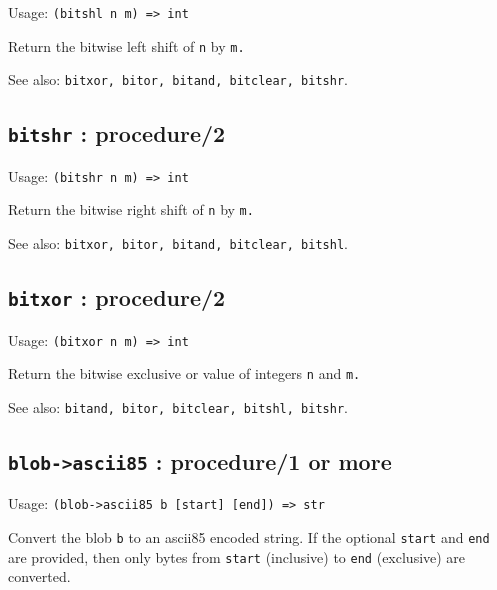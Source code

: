 \documentclass[
]{article}
\newcommand{\passthrough}[1]{#1}
\begin{document}
Usage: \passthrough{\lstinline!(bitshl n m) => int!}

Return the bitwise left shift of \passthrough{\lstinline!n!} by
\passthrough{\lstinline!m.!}

See also:
\passthrough{\lstinline!bitxor, bitor, bitand, bitclear, bitshr!}.

\hypertarget{bitshr-procedure2-1}{%
\subsection{\texorpdfstring{\texttt{bitshr} :
procedure/2}{bitshr : procedure/2}}\label{bitshr-procedure2-1}}

Usage: \passthrough{\lstinline!(bitshr n m) => int!}

Return the bitwise right shift of \passthrough{\lstinline!n!} by
\passthrough{\lstinline!m.!}

See also:
\passthrough{\lstinline!bitxor, bitor, bitand, bitclear, bitshl!}.

\hypertarget{bitxor-procedure2-1}{%
\subsection{\texorpdfstring{\texttt{bitxor} :
procedure/2}{bitxor : procedure/2}}\label{bitxor-procedure2-1}}

Usage: \passthrough{\lstinline!(bitxor n m) => int!}

Return the bitwise exclusive or value of integers
\passthrough{\lstinline!n!} and \passthrough{\lstinline!m.!}

See also:
\passthrough{\lstinline!bitand, bitor, bitclear, bitshl, bitshr!}.

\hypertarget{blob-ascii85-procedure1-or-more-1}{%
\subsection{\texorpdfstring{\texttt{blob-\textgreater{}ascii85} :
procedure/1 or
more}{blob-\textgreater ascii85 : procedure/1 or more}}\label{blob-ascii85-procedure1-or-more-1}}

Usage: \passthrough{\lstinline!(blob->ascii85 b [start] [end]) => str!}

Convert the blob \passthrough{\lstinline!b!} to an ascii85 encoded
string. If the optional \passthrough{\lstinline!start!} and
\passthrough{\lstinline!end!} are provided, then only bytes from
\passthrough{\lstinline!start!} (inclusive) to
\passthrough{\lstinline!end!} (exclusive) are converted.
\end{document}
